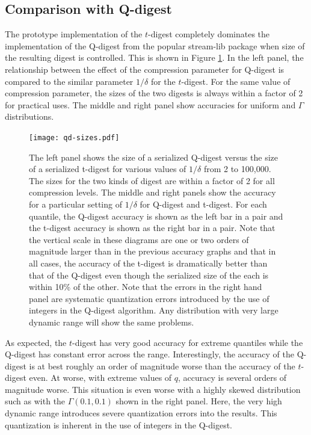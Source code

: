 \documentclass[11pt]{amsart}
\begin{document}
\subsection{Comparison with Q-digest}
The prototype implementation of the $t$-digest completely dominates the implementation of the Q-digest from the popular stream-lib package \cite{github:stream} when size of the resulting digest is controlled.  This is shown in Figure \ref{fig:qd-comparison}.  In the left panel, the relationship between the effect of the compression parameter for Q-digest is compared to the similar parameter $1/\delta$ for the $t$-digest.  For the same value of compression parameter, the sizes of the two digests is always within a factor of 2 for practical uses.  The middle and right panel show accuracies for uniform and $\Gamma$ distributions.  
\begin{figure}[htb] %
   \centering
   \texttt{[image: qd-sizes.pdf]} 
   \caption{The left panel shows the size of a serialized Q-digest versus the size of a serialized t-digest for various values of $1/\delta$ from 2 to 100,000.  The sizes for the two kinds of digest are within a factor of 2 for all compression levels.  The middle and right panels show the accuracy for a particular setting of $1/\delta$ for Q-digest and t-digest.  For each quantile, the Q-digest accuracy is shown as the left bar in a pair and the t-digest accuracy is shown as the right bar in a pair.  Note that the vertical scale in these diagrams are one or two orders of magnitude larger than in the previous accuracy graphs and that in all cases, the accuracy of the t-digest is dramatically better than that of the Q-digest even though the serialized size of the each is within 10\% of the other.   Note that the errors in the right hand panel are systematic quantization errors introduced by the use of integers in the Q-digest algorithm.  Any distribution with very large dynamic range will show the same problems.}
   \label{fig:qd-comparison}
\end{figure}

As expected, the $t$-digest has very good accuracy for extreme quantiles while the Q-digest has constant error across the range.  Interestingly, the accuracy of the Q-digest is at best roughly an order of magnitude worse than the accuracy of the $t$-digest even.  At worse, with extreme values of $q$, accuracy is several orders of magnitude worse.  This situation is even worse with a highly skewed distribution such as with the $\Gamma(0.1, 0.1)$ shown in the right panel.  Here, the very high dynamic range introduces severe quantization errors into the results.  This quantization is inherent in the use of integers in the Q-digest.
\end{document}
